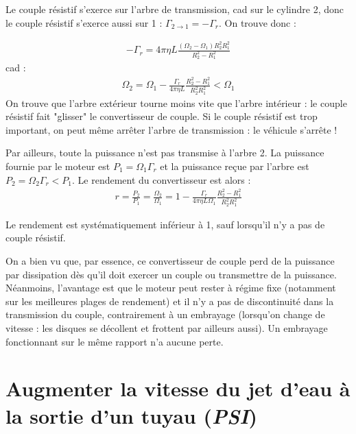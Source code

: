 \begin{correction}
\begin{enumerate}
\begin{enumerate}
	Le couple résistif s'exerce sur l'arbre de transmission, cad sur le cylindre 2, donc le couple résistif s'exerce aussi sur 1 : $\Gamma_{2\rightarrow1} = -\Gamma_r$. On trouve donc :
	
	\begin{align*}
		-\Gamma_{r}	 =4\pi\eta L\frac{(\Omega_2-\Omega_1)R_2^2R_1^2}{R_2^2-R_1^2}
	\end{align*}
	cad :
	\begin{align*}
		\Omega_2 =\Omega_1 - \frac{\Gamma_{r}}{4\pi\eta L}\frac{R_2^2-R_1^2}{R_2^2R_1^2}<\Omega_1
	\end{align*}
	On trouve que l'arbre extérieur tourne moins vite que l'arbre intérieur : le couple résistif fait "glisser" le convertisseur de couple. Si le couple résistif est trop important, on peut même arrêter l'arbre de transmission : le véhicule s'arrête ! 
	
	Par ailleurs, toute la puissance n'est pas transmise à l'arbre 2. La puissance fournie par le moteur est $P_1 = \Omega_1\Gamma_r$ et la puissance reçue par l'arbre est $P_2 = \Omega_2\Gamma_r<P_1$. Le rendement du convertisseur est alors :
	\begin{align*}
		r = \frac{P_2}{P_1} = \frac{\Omega_2}{\Omega_1}=1-\frac{\Gamma_{r}}{4\pi\eta L\Omega_1}\frac{R_2^2-R_1^2}{R_2^2R_1^2}
	\end{align*}
	
	Le rendement est systématiquement inférieur à 1, sauf lorsqu'il n'y a pas de couple résistif.
	
	On a bien vu que, par essence, ce convertisseur de couple perd de la puissance par dissipation dès qu'il doit exercer un couple ou transmettre de la puissance. Néanmoins, l'avantage est que le moteur peut rester à régime fixe (notamment sur les meilleures plages de rendement) et il n'y a pas de discontinuité dans la transmission du couple, contrairement à un embrayage (lorsqu'on change de vitesse : les disques se décollent et frottent par ailleurs aussi). Un embrayage fonctionnant sur le même rapport n'a aucune perte.
		
\end{enumerate}

\end{enumerate}

\end{correction}

\newpage

\section{Augmenter la vitesse du jet d'eau à la sortie d'un tuyau (\textit{PSI})}

